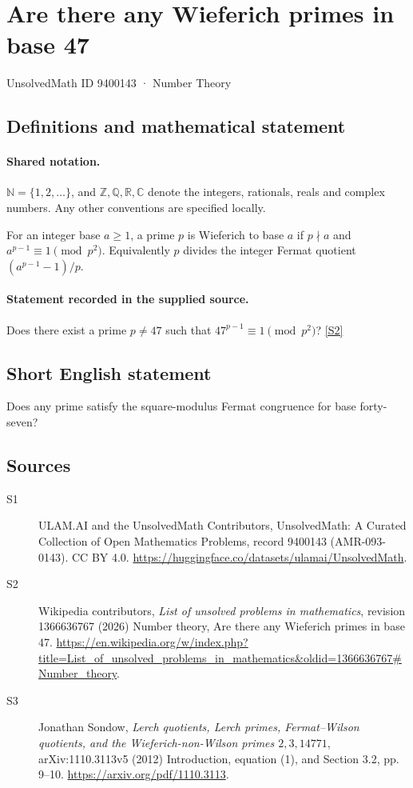 \documentclass[11pt]{article}
\newcommand{\sref}[2]{\hyperlink{source:#1:#2}{[S#2]}}
\begin{document}
\setcounter{section}{9400142}
\section{Are there any Wieferich primes in base 47}\label{9400143}
{\small\sffamily UnsolvedMath ID 9400143 · Number Theory}
\subsection{Definitions and mathematical statement}

\paragraph{Shared notation.}$\mathbb N=\{1,2,\ldots\}$, and $\mathbb Z,\mathbb Q,\mathbb R,\mathbb C$ denote the integers, rationals, reals and complex numbers. Any other conventions are specified locally.


For an integer base $a\ge1$, a prime $p$ is Wieferich to base $a$ if $p\nmid a$ and $a^{p-1}\equiv1\pmod{p^2}$. Equivalently $p$ divides the integer Fermat quotient $(a^{p-1}-1)/p$.
\paragraph{Statement recorded in the supplied source.}
Does there exist a prime $p\ne47$ such that $47^{p-1}\equiv1\pmod{p^2}$? \sref{9400143}{2}
\subsection{Short English statement}
Does any prime satisfy the square-modulus Fermat congruence for base forty-seven?
\subsection{Sources}
\begin{description}
\item[\hypertarget{source:9400143:1}{S1}] ULAM.AI and the UnsolvedMath Contributors, UnsolvedMath: A Curated Collection of Open Mathematics Problems, record 9400143 (AMR-093-0143). CC BY 4.0. \url{https://huggingface.co/datasets/ulamai/UnsolvedMath}.
\item[\hypertarget{source:9400143:2}{S2}] Wikipedia contributors, \emph{List of unsolved problems in mathematics}, revision 1366636767 (2026) Number theory, Are there any Wieferich primes in base 47. \url{https://en.wikipedia.org/w/index.php?title=List_of_unsolved_problems_in_mathematics&oldid=1366636767#Number_theory}.
\item[\hypertarget{source:9400143:3}{S3}] Jonathan Sondow, \emph{Lerch quotients, Lerch primes, Fermat--Wilson quotients, and the Wieferich-non-Wilson primes $2,3,14771$}, arXiv:1110.3113v5 (2012) Introduction, equation (1), and Section 3.2, pp. 9--10. \url{https://arxiv.org/pdf/1110.3113}.
\end{description}
\label{end:9400143}
\end{document}
